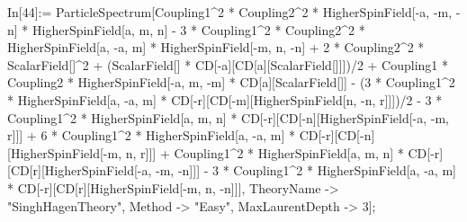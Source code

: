 In[44]:= ParticleSpectrum[Coupling1^2 * Coupling2^2 * HigherSpinField[-a, -m, -n] * HigherSpinField[a, m, n] - 3 * Coupling1^2 * Coupling2^2 * HigherSpinField[a, -a, m] * HigherSpinField[-m, n, -n] + 2 * Coupling2^2 * ScalarField[]^2 + (ScalarField[] * CD[-a][CD[a][ScalarField[]]])/2 + Coupling1 * Coupling2 * HigherSpinField[-a, m, -m] * CD[a][ScalarField[]] - (3 * Coupling1^2 * HigherSpinField[a, -a, m] * CD[-r][CD[-m][HigherSpinField[n, -n, r]]])/2 - 3 * Coupling1^2 * HigherSpinField[a, m, n] * CD[-r][CD[-n][HigherSpinField[-a, -m, r]]] + 6 * Coupling1^2 * HigherSpinField[a, -a, m] * CD[-r][CD[-n][HigherSpinField[-m, n, r]]] + Coupling1^2 * HigherSpinField[a, m, n] * CD[-r][CD[r][HigherSpinField[-a, -m, -n]]] - 3 * Coupling1^2 * HigherSpinField[a, -a, m] * CD[-r][CD[r][HigherSpinField[-m, n, -n]]], TheoryName -> "SinghHagenTheory", Method -> "Easy", MaxLaurentDepth -> 3]; 